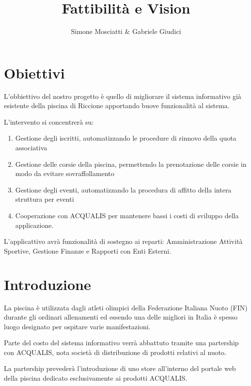\documentclass[11pt]{article} %
\title{Fattibilità e Vision}
\author{Simone Mosciatti \& Gabriele Giudici}
\begin{document}
\maketitle

\section{Obiettivi}

L'obbiettivo del nostro progetto è quello di migliorare il sistema informativo già esistente della piscina di Riccione apportando buove funzionalità al sistema.

L'intervento si concentrerà su:

\begin{enumerate}
	\item Gestione degli iscritti, automatizzando le procedure di rinnovo della quota associativa
	\item Gestione delle corsie della piscina, permettendo la prenotazione delle corsie in modo da evitare sovraffollamento
	\item Gestione degli eventi, automatizzando la procedura di affitto della intera struttura per eventi
	\item Cooperazione con ACQUALIS per mantenere bassi i costi di sviluppo della applicazione.
\end{enumerate}

L'applicattivo avrà funzionalità di sostegno ai reparti: Amministrazione Attività Sportive,  Gestione Finanze e Rapporti con Enti Esterni.



\section{Introduzione}


La piscina è utilizzata dagli atleti olimpici della Federazione Italiana Nuoto (FIN) durante gli ordinari allenamenti ed essendo una delle migliori in Italia è spesso luogo designato per ospitare varie manifestazioni.

Parte del costo del sistema informativo verrà abbattuto tramite una partership con ACQUALIS, nota società di distribuzione di prodotti relativi al nuoto.

La partership prevederà l'introduzione di uno store all'interno del portale web della piscina dedicato esclusivamente ai prodotti ACQUALIS.
\end{document}
